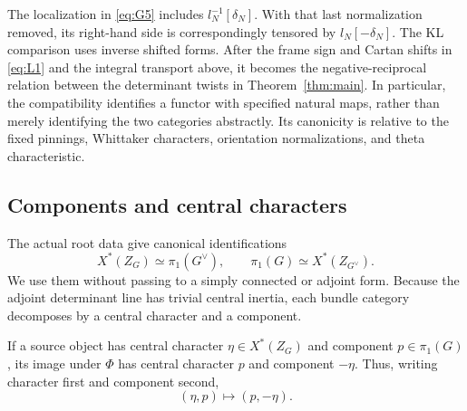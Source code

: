 The localization in \eqref{eq:G5} includes
\(l_N^{-1}[\delta_N]\).  With that last normalization removed, its
right-hand side is correspondingly tensored by \(l_N[-\delta_N]\).
The KL comparison uses inverse shifted forms.  After the frame sign and
Cartan shifts in \eqref{eq:L1} and the integral transport above, it
becomes the negative-reciprocal relation between the determinant twists
in Theorem~\ref{thm:main}.  In particular, the compatibility identifies
a functor with specified natural maps, rather than merely identifying
the two categories abstractly.  Its canonicity is relative to the fixed
pinnings, Whittaker characters, orientation normalizations, and theta
characteristic.

\subsection{Components and central characters}

The actual root data give canonical identifications
\[
 X^*(Z_G)\simeq\pi_1(G^\vee),\qquad
 \pi_1(G)\simeq X^*(Z_{G^\vee}).
\]
We use them without passing to a simply connected or adjoint form.
Because the adjoint determinant line has trivial central inertia,
each bundle category decomposes by a central character and a component.

\begin{proposition}\label{equivalence:sectors}
If a source object has central character
\(\eta\in X^*(Z_G)\) and component \(p\in\pi_1(G)\), its image
under \(\Phi\) has central character \(p\) and component \(-\eta\).
Thus, writing character first and component second,
\begin{equation}\label{eq:G6}
 (\eta,p)\longmapsto(p,-\eta).
\end{equation}
\end{proposition}

